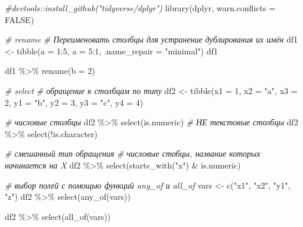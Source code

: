 \documentclass[
]{book}
\newenvironment{Shaded}{\begin{snugshade}}{\end{snugshade}}
\newcommand{\AttributeTok}[1]{\textcolor[rgb]{0.77,0.63,0.00}{#1}}
\newcommand{\CommentTok}[1]{\textcolor[rgb]{0.56,0.35,0.01}{\textit{#1}}}
\newcommand{\ConstantTok}[1]{\textcolor[rgb]{0.00,0.00,0.00}{#1}}
\newcommand{\DecValTok}[1]{\textcolor[rgb]{0.00,0.00,0.81}{#1}}
\newcommand{\FunctionTok}[1]{\textcolor[rgb]{0.00,0.00,0.00}{#1}}
\newcommand{\NormalTok}[1]{#1}
\newcommand{\OtherTok}[1]{\textcolor[rgb]{0.56,0.35,0.01}{#1}}
\newcommand{\SpecialCharTok}[1]{\textcolor[rgb]{0.00,0.00,0.00}{#1}}
\newcommand{\StringTok}[1]{\textcolor[rgb]{0.31,0.60,0.02}{#1}}
\begin{document}
\begin{Shaded}
\begin{Highlighting}[]
\CommentTok{\#devtools::install\_github("tidyverse/dplyr")}
\FunctionTok{library}\NormalTok{(dplyr, }\AttributeTok{warn.conflicts =} \ConstantTok{FALSE}\NormalTok{)}

\CommentTok{\# rename}
\CommentTok{\# Переименовать столбцы для устранение дублирования их имён}
\NormalTok{df1 }\OtherTok{\textless{}{-}} \FunctionTok{tibble}\NormalTok{(}\AttributeTok{a =} \DecValTok{1}\SpecialCharTok{:}\DecValTok{5}\NormalTok{, }\AttributeTok{a =} \DecValTok{5}\SpecialCharTok{:}\DecValTok{1}\NormalTok{, }\AttributeTok{.name\_repair =} \StringTok{"minimal"}\NormalTok{)}
\NormalTok{df1}

\NormalTok{df1 }\SpecialCharTok{\%\textgreater{}\%} \FunctionTok{rename}\NormalTok{(}\AttributeTok{b =} \DecValTok{2}\NormalTok{)}

\CommentTok{\# select}
\CommentTok{\# обращение к столбцам по типу}
\NormalTok{df2 }\OtherTok{\textless{}{-}} \FunctionTok{tibble}\NormalTok{(}\AttributeTok{x1 =} \DecValTok{1}\NormalTok{, }\AttributeTok{x2 =} \StringTok{"a"}\NormalTok{, }\AttributeTok{x3 =} \DecValTok{2}\NormalTok{, }\AttributeTok{y1 =} \StringTok{"b"}\NormalTok{, }\AttributeTok{y2 =} \DecValTok{3}\NormalTok{, }\AttributeTok{y3 =} \StringTok{"c"}\NormalTok{, }\AttributeTok{y4 =} \DecValTok{4}\NormalTok{)}

\CommentTok{\# числовые столбцы}
\NormalTok{df2 }\SpecialCharTok{\%\textgreater{}\%} \FunctionTok{select}\NormalTok{(is.numeric)}
\CommentTok{\# НЕ текстовые столбцы}
\NormalTok{df2 }\SpecialCharTok{\%\textgreater{}\%} \FunctionTok{select}\NormalTok{(}\SpecialCharTok{!}\NormalTok{is.character)}

\CommentTok{\# смешанный тип обращения}
\CommentTok{\# числовые стобцы, название которых начинается на X}
\NormalTok{df2 }\SpecialCharTok{\%\textgreater{}\%} \FunctionTok{select}\NormalTok{(}\FunctionTok{starts\_with}\NormalTok{(}\StringTok{"x"}\NormalTok{) }\SpecialCharTok{\&}\NormalTok{ is.numeric)}


\CommentTok{\# выбор полей с помощью функций any\_of и all\_of}
\NormalTok{vars }\OtherTok{\textless{}{-}} \FunctionTok{c}\NormalTok{(}\StringTok{"x1"}\NormalTok{, }\StringTok{"x2"}\NormalTok{, }\StringTok{"y1"}\NormalTok{, }\StringTok{"z"}\NormalTok{)}
\NormalTok{df2 }\SpecialCharTok{\%\textgreater{}\%} \FunctionTok{select}\NormalTok{(}\FunctionTok{any\_of}\NormalTok{(vars))}

\NormalTok{df2 }\SpecialCharTok{\%\textgreater{}\%} \FunctionTok{select}\NormalTok{(}\FunctionTok{all\_of}\NormalTok{(vars))}



\end{Highlighting}
\end{Shaded}
\end{document}
